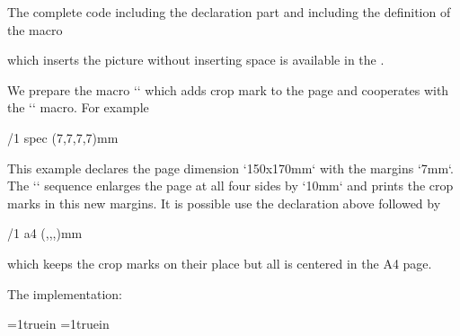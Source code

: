 The complete code including the declaration part and including the definition of the macro 

\begtt
{} 
\endtt


which inserts the picture without inserting space is available in the . 


 


We prepare the macro `\cropmark` which adds crop mark to the page and cooperates with the `\margins` macro. For example 

\begtt
{} 
\margins/1 spec (7,7,7,7)mm \cropmarks 
\endtt


This example declares the page dimension `150x170mm` with the margins `7mm`. The `\cropmarks` sequence enlarges the page at all four sides by `10mm` and prints the crop marks in this new margins. It is possible use the declaration above followed by 

\begtt
\margins/1 a4 (,,,)mm \cropcenter 
\endtt


which keeps the crop marks on their place but all is centered in the A4 page. 



The implementation: 

\begtt
\newdimen\cropw \cropw=10mm 
\def\ltcrop{\vbox{\hbox to\cropw{\hfil\vrule height\cropw depth-.2\cropw} 
                  \hbox to\cropw{\vrule height.4pt width.8\cropw \hfil}}} 
\def\rtcrop{\vbox{\hbox to\cropw{\vrule height\cropw depth-.2\cropw\hfil} 
                  \hbox to\cropw{\hfil\vrule height.4pt width.8\cropw}}} 
\def\lbcrop{\vbox{\hbox to\cropw{\vrule height.4pt width.8\cropw \hfil} 
                  \kern.2\cropw \hbox to\cropw{\hfil\vrule height.8\cropw}}} 
\def\rbcrop{\vbox{\hbox to\cropw{\hfil\vrule height.4pt width.8\cropw} 
                  \kern.2\cropw \hbox to\cropw{\vrule height.8\cropw\hfil}}} 
 
\newdimen\lmar \newdimen\tmar \tmar=1truein \lmar=1truein 
\def\cropmarks{%
   \ifx\cropwidth\undefined 
      \advance\lmar by\hoffset \advance\tmar by\voffset 
      \hoffset=-1truein \voffset=-1truein 
      \advance\pdfpagewidth by2\cropw \advance\pdfpageheight by2\cropw 
      \dimen0=\pgwidth \advance\dimen0 by2\cropw \edef\cropwidth{\the\dimen0}%
      \edef\cropheight{\the\pgheight} 
      \let\shipoutori=\shipout 
      \def\shipout##1 {\shipoutori %
         \vbox{\let\vrule=\orivrule \let\hrule=\orihrule 
               \offinterlineskip \kern.2pt 
               \hbox to\cropwidth{\kern.2pt\ltcrop\hfil\rtcrop\kern.2pt}%
               \kern-.2pt 
               \vbox to\cropheight{\kern\tmar\hbox{\kern\cropw\kern\lmar\box0}\vss} 
               \kern-.2pt 
               \hbox to\cropwidth{\kern.2pt\lbcrop\hfil\rbcrop\kern2.pt}}}%
   \else\errmessage{\noexpand\cropmarks can't by used twice}\fi 
} 
\def\cropcenter{\advance\hoffset by-\lmar \advance\hoffset by-\cropw 
                \advance\voffset by-\tmar \advance\voffset by-\cropw} 
\endtt

